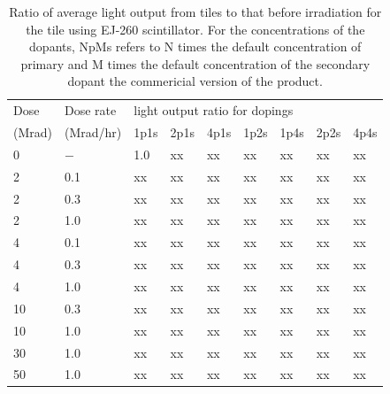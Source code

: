 \documentclass[review]{elsarticle}
\begin{document}
\begin{table}[thb]
\centering
\caption{
Ratio of average light output from tiles to that before irradiation
for the tile using EJ-260 scintillator.  For the concentrations
of the dopants, NpMs refers to N times the default concentration of primary and M times the default concentration of the secondary dopant
the commericial version of the product.
}
\label{tab:ResultsEJ260}
{\small
\begin{tabular}{|l| l| l| l| l| l| l| l| l|}
\hline
Dose & Dose rate  &\multicolumn{7}{|l|}{light output ratio for dopings} \\
(Mrad)  & (Mrad/hr) & 1p1s & 2p1s & 4p1s & 1p2s & 1p4s & 2p2s & 4p4s   \\
\hline
\hline
0 & $-$ & 1.0 & {\color{red} xx} & {\color{red} xx} & {\color{red} xx}& {\color{red} xx} & {\color{red} xx} & {\color{red} xx}\\ \hline
2 & 0.1 & {\color{red} xx} & {\color{red} xx} & {\color{red} xx} & {\color{red} xx}& {\color{red} xx} & {\color{red} xx} & {\color{red} xx}\\
2 & 0.3 & {\color{red} xx} & {\color{red} xx} & {\color{red} xx} & {\color{red} xx}& {\color{red} xx} & {\color{red} xx} & {\color{red} xx}\\
2 & 1.0 & {\color{red} xx} & {\color{red} xx} & {\color{red} xx} & {\color{red} xx}& {\color{red} xx} & {\color{red} xx} & {\color{red} xx}\\ \hline
4 & 0.1 & {\color{red} xx} & {\color{red} xx} & {\color{red} xx} & {\color{red} xx}& {\color{red} xx} & {\color{red} xx} & {\color{red} xx}\\
4 & 0.3 & {\color{red} xx} & {\color{red} xx} & {\color{red} xx} & {\color{red} xx} & {\color{red} xx} & {\color{red} xx} & {\color{red} xx}\\ 
4 & 1.0 & {\color{red} xx} & {\color{red} xx} & {\color{red} xx} & {\color{red} xx}& {\color{red} xx} & {\color{red} xx} & {\color{red} xx}\\ \hline
10 & 0.3 & {\color{red} xx} & {\color{red} xx} & {\color{red} xx} & {\color{red} xx}& {\color{red} xx} & {\color{red} xx} & {\color{red} xx}\\
10 & 1.0 & {\color{red} xx} & {\color{red} xx} & {\color{red} xx} & {\color{red} xx}& {\color{red} xx} & {\color{red} xx} & {\color{red} xx}\\ \hline
30 & 1.0 & {\color{red} xx} & {\color{red} xx} & {\color{red} xx} & {\color{red} xx}& {\color{red} xx} & {\color{red} xx} & {\color{red} xx}\\ \hline
50 & 1.0 & {\color{red} xx} & {\color{red} xx} & {\color{red} xx} & {\color{red} xx}& {\color{red} xx} & {\color{red} xx} & {\color{red} xx}\\ \hline
\hline
\end{tabular}
}
\end{table}
\end{document}

